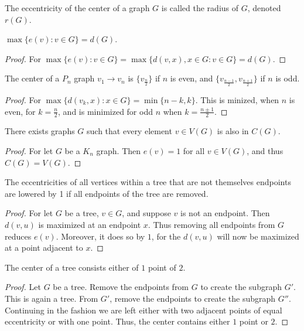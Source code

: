 \documentclass[crop=false,class=book]{standalone}
\begin{document}
\begin{definition}
The eccentricity of the center of a graph $G$ is called the radius of $G$, denoted $r(G)$.
\end{definition}
\begin{corollary}
$\max\{e(v):v\in G\}= d(G)$.
\end{corollary}
\begin{proof}
For $\max\{e(v):v\in G\} = \max\{d(v,x), x\in G:v\in G\} = d(G)$.
\end{proof}
\begin{corollary}
The center of a $P_n$ graph $v_1\rightarrow v_n$ is $\{v_\frac{n}{2}\}$ if $n$ is even, and $\{v_{\frac{n-1}{2}},v_{\frac{n+1}{2}}\}$ if $n$ is odd.
\end{corollary}
\begin{proof}
For $\max\{d(v_k,x):x\in G\} = \min\{n-k,k\}$. This is minized, when $n$ is even, for $k= \frac{n}{2}$, and is minimized for odd $n$ when $k=\frac{n\pm 1}{2}$.
\end{proof}
\begin{corollary}
There exists graphs $G$ such that every element $v\in V(G)$ is also in $C(G)$.
\end{corollary}
\begin{proof}
For let $G$ be a $K_n$ graph. Then $e(v) = 1$ for all $v\in V(G)$, and thus $C(G) = V(G)$.
\end{proof}
\begin{corollary}
The eccentricities of all vertices within a tree that are not themselves endpoints are lowered by 1 if all endpoints of the tree are removed.
\end{corollary}
\begin{proof}
For let $G$ be a tree, $v\in G$, and suppose $v$ is not an endpoint. Then $d(v,u)$ is maximized at an endpoint $x$. Thus removing all endpoints from $G$ reduces $e(v)$. Moreover, it does so by $1$, for the $d(v,u)$ will now be maximized at a point adjacent to $x$.
\end{proof}
\begin{theorem}
The center of a tree consists either of $1$ point of $2$.
\end{theorem}
\begin{proof}
Let $G$ be a tree. Remove the endpoints from $G$ to create the subgraph $G'$. This is again a tree. From $G'$, remove the endpoints to create the subgraph $G''$. Continuing in the fashion we are left either with two adjacent points of equal eccentricity or with one point. Thus, the center contains either $1$ point or $2$.
\end{proof}
\end{document}

